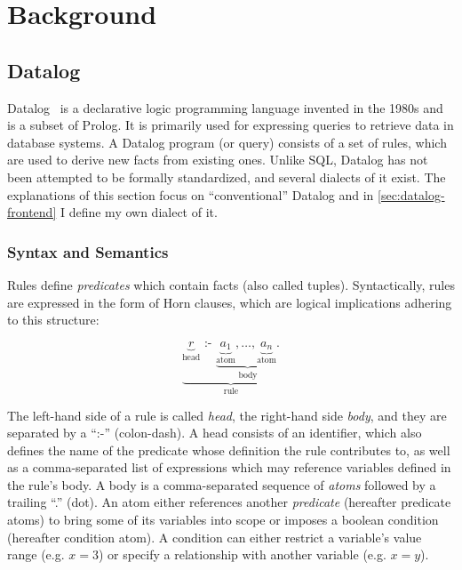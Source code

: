 
\chapter{Background}\label{ch:background}

\section{Datalog}\label{sec:datalog}

Datalog~\cite{green2013datalog} is a declarative logic programming language
invented in the 1980s and is a subset of Prolog.
It is primarily used for expressing queries to retrieve data in database systems.
A Datalog program (or query) consists of a set of rules,
which are used to derive new facts from existing ones.
Unlike SQL, Datalog has not been attempted to be formally standardized,
and several dialects of it exist.
The explanations of this section focus on ``conventional'' Datalog
and in \ref{sec:datalog-frontend} I define my own dialect of it.

\subsection{Syntax and Semantics}\label{sec:datalog-syntax-semantics}

Rules define \emph{predicates} which contain facts (also called tuples).
Syntactically, rules are expressed in the form of Horn clauses,
which are logical implications adhering to this structure:

\begin{equation}
	\underbrace{
	\underbrace{r}_{\text{head}}
	\text{ :- }
	\underbrace{
	\underbrace{a_1}_{\text{atom}},
	\ldots,
	\underbrace{a_n}_{\text{atom}}.
	}_{\text{body}}
	}_{\text{rule}}
\end{equation}

The left-hand side of a rule is called \emph{head}, the right-hand side \emph{body},
and they are separated by a ``:-'' (colon-dash).
A head consists of an identifier, which also defines the name of the predicate
whose definition the rule contributes to, as well as a comma-separated list of expressions
which may reference variables defined in the rule's body.
A body is a comma-separated sequence of \emph{atoms} followed by a trailing ``.'' (dot).
An atom either references another \emph{predicate} (hereafter predicate atoms)
to bring some of its variables into scope or imposes a boolean condition
(hereafter condition atom).
A condition can either restrict a variable's value range (e.g. \(x = 3\))
or specify a relationship with another variable (e.g. \(x = y\)).

